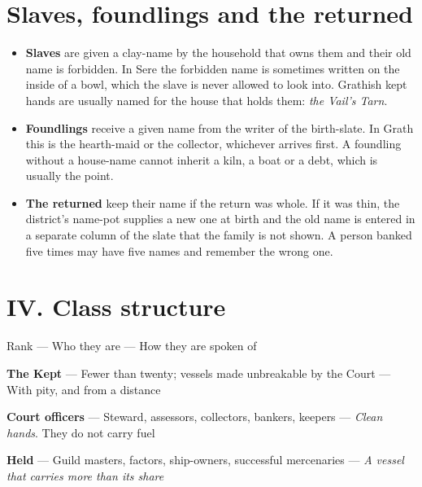 \documentclass{design/chronicle}
\begin{document}
\section*{Slaves, foundlings and the returned}

\begin{itemize}[leftmargin=1.4em,itemsep=1pt,topsep=3pt,parsep=0pt]

\item \textbf{Slaves} are given a clay-name by the household that owns them and their old name is forbidden. In Sere the forbidden name is sometimes written on the inside of a bowl, which the slave is never allowed to look into. Grathish kept hands are usually named for the house that holds them: \emph{the Vail’s Tarn}.

\item \textbf{Foundlings} receive a given name from the writer of the birth-slate. In Grath this is the hearth-maid or the collector, whichever arrives first. A foundling without a house-name cannot inherit a kiln, a boat or a debt, which is usually the point.

\item \textbf{The returned} keep their name if the return was whole. If it was thin, the district’s name-pot supplies a new one at birth and the old name is entered in a separate column of the slate that the family is not shown. A person banked five times may have five names and remember the wrong one.

\end{itemize}

\CRrule

\section*{IV. Class structure}

Rank — Who they are — How they are spoken of\par

\textbf{The Kept} — Fewer than twenty; vessels made unbreakable by the Court — With pity, and from a distance\par

\textbf{Court officers} — Steward, assessors, collectors, bankers, keepers — \emph{Clean hands}. They do not carry fuel\par

\textbf{Held} — Guild masters, factors, ship-owners, successful mercenaries — \emph{A vessel that carries more than its share}\par
\end{document}
